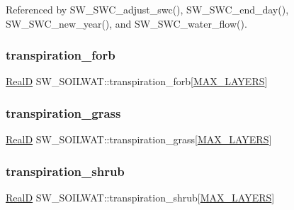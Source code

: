 Referenced by S\+W\+\_\+\+S\+W\+C\+\_\+adjust\+\_\+swc(), S\+W\+\_\+\+S\+W\+C\+\_\+end\+\_\+day(), S\+W\+\_\+\+S\+W\+C\+\_\+new\+\_\+year(), and S\+W\+\_\+\+S\+W\+C\+\_\+water\+\_\+flow().

\mbox{\label{struct_s_w___s_o_i_l_w_a_t_a68e5c33a1f6adf10b5a753a05f624d8d}} 
\subsubsection{\texorpdfstring{transpiration\+\_\+forb}{transpiration\_forb}}
{\footnotesize\ttfamily \hyperlink{generic_8h_af1c105fd5732f70b91ddaeda0cc340e3}{RealD} S\+W\+\_\+\+S\+O\+I\+L\+W\+A\+T\+::transpiration\+\_\+forb\mbox{[}\hyperlink{_s_w___defines_8h_ade9d4b2ac5f29fe89ffea40e7c58c9d6}{M\+A\+X\+\_\+\+L\+A\+Y\+E\+RS}\mbox{]}}

\mbox{\label{struct_s_w___s_o_i_l_w_a_t_a9d390d06432096765fa4ccee86c0d52c}} 
\subsubsection{\texorpdfstring{transpiration\+\_\+grass}{transpiration\_grass}}
{\footnotesize\ttfamily \hyperlink{generic_8h_af1c105fd5732f70b91ddaeda0cc340e3}{RealD} S\+W\+\_\+\+S\+O\+I\+L\+W\+A\+T\+::transpiration\+\_\+grass\mbox{[}\hyperlink{_s_w___defines_8h_ade9d4b2ac5f29fe89ffea40e7c58c9d6}{M\+A\+X\+\_\+\+L\+A\+Y\+E\+RS}\mbox{]}}

\mbox{\label{struct_s_w___s_o_i_l_w_a_t_afa1a05309f50aed97ddc45eb681cd64c}} 
\subsubsection{\texorpdfstring{transpiration\+\_\+shrub}{transpiration\_shrub}}
{\footnotesize\ttfamily \hyperlink{generic_8h_af1c105fd5732f70b91ddaeda0cc340e3}{RealD} S\+W\+\_\+\+S\+O\+I\+L\+W\+A\+T\+::transpiration\+\_\+shrub\mbox{[}\hyperlink{_s_w___defines_8h_ade9d4b2ac5f29fe89ffea40e7c58c9d6}{M\+A\+X\+\_\+\+L\+A\+Y\+E\+RS}\mbox{]}}

